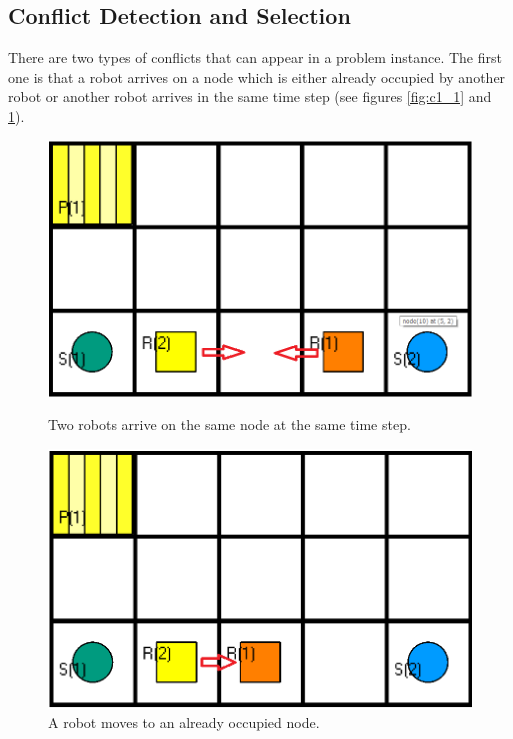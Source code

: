 \documentclass[runningheads]{llncs}
\begin{document}
\subsection{Conflict Detection and Selection}
There are two types of conflicts that can appear in a problem instance. The first one is that a robot arrives on a node which is either already occupied by another robot or another robot arrives in the same time step (see figures \ref{fig:c1_1} and \ref{fig:c1_2}).

\begin{figure}
   \begin{minipage}[b]{.4\linewidth} 
      \includegraphics[width=\linewidth]{Images/Conflict 1_1}
      \caption{Two robots arrive on the same node at the same time step.}
      \label{fig:c1_1}
   \end{minipage}
   \hspace{.1\linewidth}
   \begin{minipage}[b]{.4\linewidth} 
      \includegraphics[width=\linewidth]{Images/Conflict 1_2}
      \caption{A robot moves to an already occupied node.}
      \label{fig:c1_2}
   \end{minipage}
\end{figure} 
\end{document}
